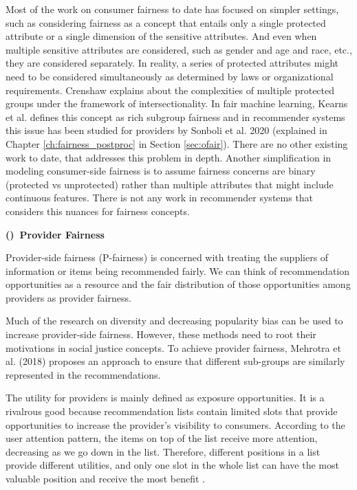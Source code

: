                 Most of the work on consumer fairness to date has focused on simpler settings, such as considering fairness as a concept that entails only a single protected attribute or a single dimension of the sensitive attributes. And even when multiple sensitive attributes are considered, such as gender and age and race, etc., they are considered separately. In reality, a series of protected attributes might need to be considered simultaneously as determined by laws or organizational requirements. Crenshaw \cite{crenshaw1989demarginalizing} explains about the complexities of multiple protected groups under the framework of intersectionality. In fair machine learning, Kearns et al. \cite{kearns2019empirical} defines this concept as rich subgroup fairness and in recommender systems this issue has been studied for providers by Sonboli et al. 2020 \cite{sonboli2020opportunistic}  (explained in Chapter \ref{ch:fairness_postproc} in Section \ref{sec:ofair}). There are no other existing work to date, that addresses this problem in depth. Another simplification in modeling consumer-side fairness is to assume fairness concerns are binary (protected vs unprotected) rather than multiple attributes that might include continuous features. There is not any work in recommender systems that considers this nuances for fairness concepts.

        \textbf{()~Provider Fairness}

            Provider-side fairness (P-fairness) is concerned with treating the suppliers of information or items being recommended fairly. We can think of recommendation opportunities as a resource and the fair distribution of those opportunities among providers as provider fairness. 
            
            Much of the research on diversity and decreasing popularity bias can be used to increase provider-side fairness. However, these methods need to root their motivations in social justice concepts. To achieve provider fairness, Mehrotra et al. (2018) \cite{mehtora2018towards} proposes an approach to ensure that different sub-groups are similarly represented in the recommendations.
                
            The utility for providers is mainly defined as exposure opportunities. It is a rivalrous good because recommendation lists contain limited slots that provide opportunities to increase the provider's visibility to consumers. According to the user attention pattern, the items on top of the list receive more attention, decreasing as we go down in the list. Therefore, different positions in a list provide different utilities, and only one slot in the whole list can have the most valuable position and receive the most benefit \cite{diaz2020}. 
            
